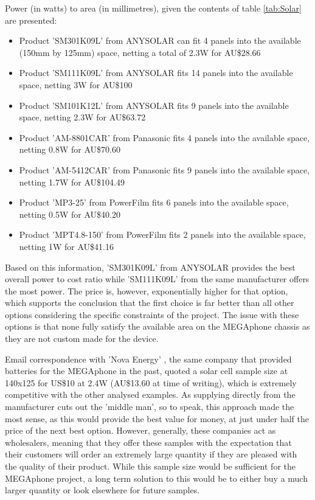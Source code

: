 Power (in watts) to area (in millimetres), given the contents of table \ref{tab:Solar} are presented:
\begin{itemize}
    \item Product 'SM301K09L' \cite{SM301K09L} from ANYSOLAR can fit 4 panels into the available (150mm by 125mm) space, netting a total of 2.3W for AU\$28.66
    \item Product 'SM111K09L' \cite{SM111K09L} from ANYSOLAR fits 14 panels into the available space, netting 3W for AU\$100
    \item Product 'SM101K12L' \cite{SM101K12L} from ANYSOLAR fits 9 panels into the available space, netting 2.3W for AU\$63.72
    \item Product 'AM-8801CAR' \cite{am8801} from Panasonic fits 4 panels into the available space, netting 0.8W for AU\$70.60
    \item Product 'AM-5412CAR' \cite{am5412} from Panasonic fits 9 panels into the available space, netting 1.7W for AU\$104.49
    \item Product 'MP3-25' \cite{mp3} from PowerFilm fits 6 panels into the available space, netting 0.5W for AU\$40.20
    \item Product 'MPT4.8-150' \cite{mpt} from PowerFilm fits 2 panels into the available space, netting 1W for AU\$41.16
\end{itemize}

Based on this information, 'SM301K09L' from ANYSOLAR provides the best overall power to cost ratio while 'SM111K09L' from the same manufacturer offers the most power.
The price is, however, exponentially higher for that option, which supports the conclusion that the first choice is far better than all other options considering the specific constraints of the project.
The issue with these options is that none fully satisfy the available area on the MEGAphone chassis as they are not custom made for the device.

Email correspondence with 'Nova Energy' \cite{nova}, the same company that provided batteries for the MEGAphone in the past, quoted a solar cell sample size at 140x125 for US\$10 at 2.4W (AU\$13.60 at time of writing), which is extremely competitive with the other analysed examples.
As supplying directly from the manufacturer cuts out the 'middle man', so to speak, this approach made the most sense, as this would provide the best value for money, at just under half the price of the next best option.
However, generally, these companies act as wholesalers, meaning that they offer these samples with the expectation that their customers will order an extremely large quantity if they are pleased with the quality of their product.
While this sample size would be sufficient for the MEGAphone project, a long term solution to this would be to either buy a much larger quantity or look elsewhere for future samples.

